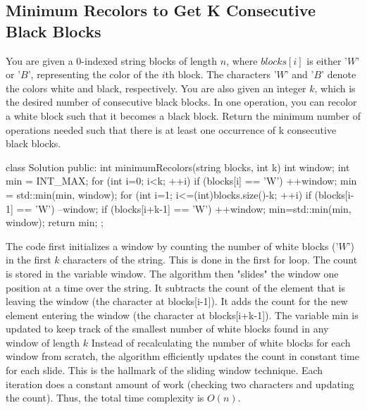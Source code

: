 \documentclass{report}
\begin{document}
   \subsection{Minimum Recolors to Get K Consecutive Black Blocks}
   \bigbreak \noindent 
   You are given a 0-indexed string blocks of length $n$, where $blocks[i]$ is either '$W$' or '$B$', representing the color of the $i$th block. The characters '$W$' and '$B$' denote the colors white and black, respectively.
   \bigbreak \noindent 
   You are also given an integer $k$, which is the desired number of consecutive black blocks.
   \bigbreak \noindent 
   In one operation, you can recolor a white block such that it becomes a black block.
   \bigbreak \noindent 
   Return the minimum number of operations needed such that there is at least one occurrence of k consecutive black blocks.
   \bigbreak \noindent 
   \begin{cppcode}
       class Solution {
           public:
           int minimumRecolors(string blocks, int k) {
               int window{};
               int min = INT_MAX;
               for (int i=0; i<k; ++i) {
                   if (blocks[i] == 'W') ++window;
               }
               min = std::min(min, window);
               for (int i=1; i<=(int)blocks.size()-k; ++i) {
                   if (blocks[i-1] == 'W') --window; 
                   if (blocks[i+k-1] == 'W') ++window;
                   min=std::min(min, window);
               }
               return min;
           }
       };
   \end{cppcode}
   \bigbreak \noindent 
   The code first initializes a window by counting the number of white blocks ('$W$') in the first $k$ characters of the string. This is done in the first for loop. The count is stored in the variable window.
   \bigbreak \noindent 
   The algorithm then "slides" the window one position at a time over the string.
   \bigbreak \noindent 
   It subtracts the count of the element that is leaving the window (the character at blocks[i-1]).
   \bigbreak \noindent 
   It adds the count for the new element entering the window (the character at blocks[i+k-1]).
   \bigbreak \noindent 
   The variable min is updated to keep track of the smallest number of white blocks found in any window of length $k$
   \bigbreak \noindent 
   Instead of recalculating the number of white blocks for each window from scratch, the algorithm efficiently updates the count in constant time for each slide. This is the hallmark of the sliding window technique.
   \bigbreak \noindent 
   Each iteration does a constant amount of work (checking two characters and updating the count). Thus, the total time complexity is $O(n)$.
\end{document}
